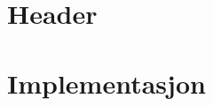 \documentclass[a4paper]{article}
\begin{document}
\section*{Header}

\newpage
\section*{Implementasjon}

\end{document}
